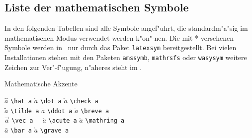 
\subsection{Liste der mathematischen Symbole}  \label{symbols}

In den folgenden Tabellen sind alle Symbole angef"uhrt, die
standard\-m"a"sig im mathematischen Modus verwendet werden
k"on"-nen.  Die mit * versehenen Symbole werden
in \LaTeXe\ nur durch das Paket \texttt{latexsym} bereitgestellt.  Bei
vielen Installationen stehen mit den Paketen \texttt{amssymb}, 
\texttt{mathrsfs} oder \texttt{wasysym} weitere Zeichen zur 
Ver"-f"ugung, n"aheres steht im \local.


\begin{table}[hbp]
\caption{Mathematische Akzente}  \label{mathakz}
\begin{symbols}
$\hat a$    \> \verb|\hat a|   \> $\dot a$   \> \verb|\dot a|   \> $\check a$    \> \verb|\check a|    \\ 
$\tilde a$  \> \verb|\tilde a| \> $\ddot a$  \> \verb|\ddot a|  \> $\breve a$    \> \verb|\breve a|    \\
$\vec a$    \> \verb|\vec a  | \> $\acute a$ \> \verb|\acute a| \> $\mathring a$ \> \verb|\mathring a| \\
$\bar a$    \> \verb|\bar a|   \> $\grave a$ \> \verb|\grave a| \\
\end{symbols}
\end{table}

